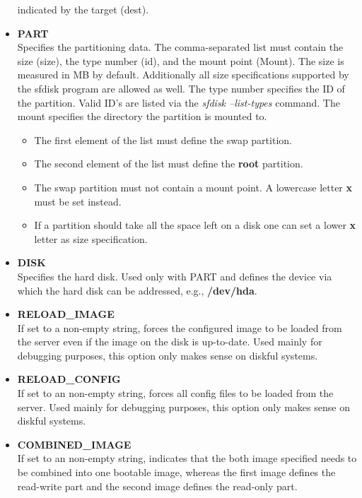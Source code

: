 \begin{itemize}
		indicated by the target (dest).
	\item \textbf{PART}\\
		Specifies the partitioning data. The comma-separated list
		must contain the size (size), the type number (id), and the
		mount point (Mount). The size is measured in MB by default.
		Additionally all size specifications supported by the sfdisk
		program are allowed as well. The type number specifies the ID
		of the partition. Valid ID's are listed via the
		\textit{sfdisk --list-types} command. The mount specifies the
		directory the partition is mounted to.
		\begin{itemize}
			\item The first element of the list must define the swap
                  partition.
            \item The second element of the list must define the
                  \textbf{root} partition.
	        \item The swap partition must not contain a mount point.
                  A lowercase letter \textbf{x} must be set instead.
            \item If a partition should take all the space left on
                  a disk one can set a lower \textbf{x} letter as
                  size specification.
		\end{itemize}
	\item \textbf{DISK}\\
		Specifies the hard disk. Used only with PART and defines
		the device via which the hard disk can be addressed,
		e.g., \textbf{/dev/hda}.
	\item \textbf{RELOAD\_IMAGE}\\
		If set to a non-empty string, forces the configured
		image to be loaded from the server even if the image on
		the disk is up-to-date. Used mainly for debugging
		purposes, this option only makes sense on diskful
		systems.
	\item \textbf{RELOAD\_CONFIG}\\
		If set to an non-empty string, forces all config files
		to be loaded from the server. Used mainly for debugging
		purposes, this option only makes sense on diskful
		systems.
	\item \textbf{COMBINED\_IMAGE}\\
        If set to an non-empty string, indicates that the both
        image specified needs to be combined into one bootable
        image, whereas the first image defines the read-write
        part and the second image defines the read-only part.

\end{itemize}
